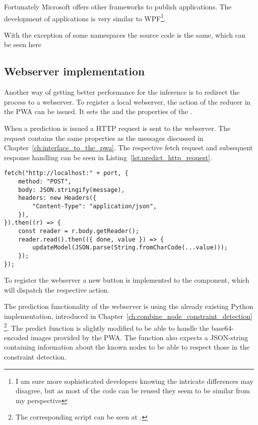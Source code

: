 Fortunately Microsoft offers other frameworks to publish applications.
The development of  applications is very similar to WPF\footnote{I am sure more sophisticated developers knowing the intricate differences may disagree, but as most of the code can be reused they seem to be similar from my perspective}.

With the exception of some namespaces the source code is the same, which can be seen here 

\subsection{Webserver implementation}

Another way of getting better performance for the inference is to redirect the process to a webserver.
To register a local webserver, the  action of the  reducer in the PWA can be issued.
It sets the  and the  properties of the .

When a prediction is issued a HTTP request is sent to the webserver.
The request  contains the same properties as the messages discussed in Chapter~\ref{ch:interface_to_the_pwa}.
The respective fetch request and subsequent response handling can be seen in Listing~\ref{lst:predict_http_request}.

\begin{lstlisting}[label={lst:predict_http_request}, caption={Communication of PWA via HTTP.}]
fetch("http://localhost:" + port, {
    method: "POST",
    body: JSON.stringify(message),
    headers: new Headers({
        "Content-Type": "application/json",
    }),
}).then((r) => {
    const reader = r.body.getReader();
    reader.read().then(({ done, value }) => {
        updateModel(JSON.parse(String.fromCharCode(...value)));
    });
});
\end{lstlisting}

To register the webserver a new button is implemented to the  component, which will dispatch the respective  action. 

The prediction functionality of the webserver is using the already existing Python implementation, introduced in Chapter~\ref{ch:combine_node_constraint_detection}
\footnote{The corresponding script can be seen at .}.
The predict function is slightly modified to be able to handle the base64-encoded images provided by the PWA.
The function also expects a JSON-string containing information about the known nodes to be able to respect those in the constraint detection.


